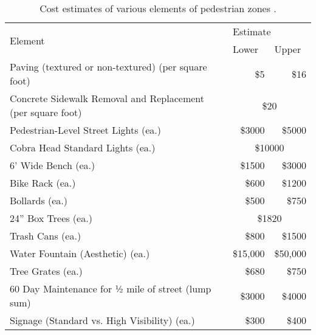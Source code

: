 \begin{table}[!htbp]
\centering
\begin{tabular}{@{}lrr@{}}
\toprule
\multirow{2}{*}{Element}                  & \multicolumn{2}{l}{Estimate}                          \\ \cmidrule(l){2-3} 
                                          & \multicolumn{1}{l}{Lower} & \multicolumn{1}{l}{Upper} \\
\midrule

Paving (textured or non-textured) (per square foot)         & \$5                   & \$16                  \\

Concrete Sidewalk Removal and Replacement (per square foot) & \multicolumn{2}{c}{\$20}                          \\


Pedestrian-Level Street Lights (ea.)            & \$3000                & \$5000                 \\
Cobra Head Standard Lights (ea.)               & \multicolumn{2}{c}{\$10000}                       \\
6’ Wide Bench (ea.)                           & \$1500                & \$3000                \\
Bike Rack (ea.)                                 & \$600                 & \$1200                 \\
Bollards (ea.)                                  & \$500                  & \$750                 \\
24” Box Trees (ea.)                             & \multicolumn{2}{c}{\$1820 }                        \\
Trash Cans (ea.)                                & \$800                 & \$1500                 \\
Water Fountain (Aesthetic) (ea.)                & \$15,000               & \$50,000               \\
Tree Grates (ea.)                               & \$680                  & \$750                  \\
60 Day Maintenance for ½ mile of street (lump sum)   & \$3000           & \$4000       \\
Signage (Standard vs. High Visibility) (ea.)    & \$300                & \$400               \\
\bottomrule
\end{tabular}
\caption[Cost estimates of various elements of pedestrian zones]{Cost estimates of various elements of pedestrian zones \cite{PZ3}.}\label{table:pedestrian-zone-costs}
\end{table}